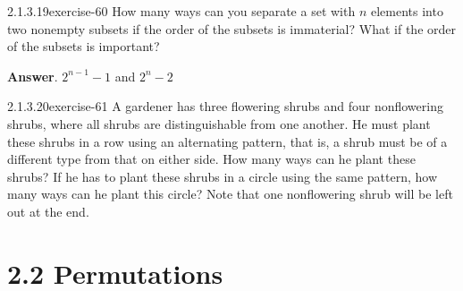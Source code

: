 \documentclass[twoside,10pt,]{book}
\numberwithin{equation}{section}
\begin{document}
\begin{divisionsolution}{2.1.3.19}{}{exercise-60}%
\hypertarget{p-626}{}%
How many ways can you separate a set with \(n\)  elements into two nonempty subsets if the order of the subsets is immaterial? What if the order of the subsets is important?%
\par\smallskip%
\noindent\textbf{Answer}.\quad%
\hypertarget{p-627}{}%
\(2^{n-1}-1\) and \(2^n-2\)%
\end{divisionsolution}%
\begin{divisionsolution}{2.1.3.20}{}{exercise-61}%
\hypertarget{p-628}{}%
A gardener has three flowering shrubs and four nonflowering shrubs, where all shrubs are distinguishable from one another. He must plant these shrubs in a row using an alternating pattern, that is, a shrub must be of a different type from that on either side. How many ways can he plant these shrubs? If he has to plant these shrubs in a circle using the same pattern, how many ways can he plant this circle? Note that one nonflowering shrub will be left out at the end.%
\end{divisionsolution}%
\section*{2.2 Permutations}
\end{document}
